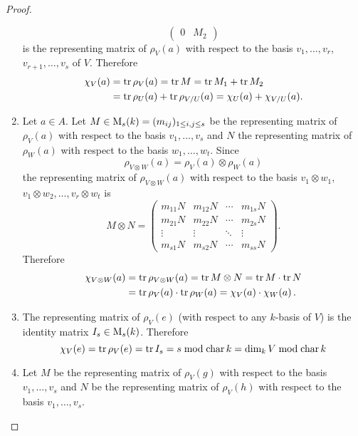 \begin{proof}
\begin{enumerate}[label=\emph{\alph*)},leftmargin=*]
\[\begin{pmatrix}
                    0 & M_2
                  \end{pmatrix}
      \]
      is the representing matrix of $\rho_V(a)$ with respect to the basis $v_1, \dotsc, v_r$, $v_{r+1}, \dotsc, v_s$ of $V$.
      Therefore
      \begin{align*}
            \chi_V(a)
        &=  \operatorname{tr} \rho_V(a)
         =  \operatorname{tr} M
         =  \operatorname{tr} M_1 + \operatorname{tr} M_2 \\
        &=  \operatorname{tr} \rho_U(a) + \operatorname{tr} \rho_{V/U}(a)
         =  \chi_U(a) + \chi_{V/U}(a).
      \end{align*}
    \item
      Let $a \in A$.
      Let $M \in \operatorname{M}_s(k) = (m_{ij})_{1 \leq i,j \leq s}$ be the representing matrix of $\rho_V(a)$ with respect to the basis $v_1, \dotsc, v_s$ and $N$ the representing matrix of $\rho_W(a)$ with respect to the basis $w_1, \dotsc, w_t$.
      Since
      \[
          \rho_{V \otimes W}(a)
        = \rho_V(a) \otimes \rho_W(a)
      \]
      the representing matrix of $\rho_{V \otimes W}(a)$ with respect to the basis $v_1 \otimes w_1$, $v_1 \otimes w_2, \dotsc, v_r \otimes w_t$ is
      \[
          M \otimes N
        = \begin{pmatrix}
            m_{11} N & m_{12} N & \cdots & m_{1s} N \\
            m_{21} N & m_{22} N & \cdots & m_{2s} N \\
            \vdots   & \vdots   & \ddots & \vdots   \\
            m_{s1} N & m_{s2} N & \cdots & m_{ss} N
          \end{pmatrix}.
      \]
      Therefore
      \begin{align*}
            \chi_{V \otimes W}(a)
        &=  \operatorname{tr} \rho_{V \otimes W}(a)
         =  \operatorname{tr} M \otimes N
         =  \operatorname{tr} M \cdot \operatorname{tr} N \\
        &=  \operatorname{tr} \rho_V(a) \cdot \operatorname{tr} \rho_W(a)
         =  \chi_V(a) \cdot \chi_W(a) \,.
      \end{align*}
    \item
      The representing matrix of $\rho_V(e)$ (with respect to any $k$-basis of $V$) is the identity matrix $I_s \in \operatorname{M}_s(k)$.
      Therefore
      \[
          \chi_V(e)
        = \operatorname{tr} \rho_V(e)
        = \operatorname{tr} I_s
        = s \bmod \operatorname{char} k
        = \dim_k V \bmod \operatorname{char} k
      \]
    \item
      Let $M$ be the representing matrix of $\rho_V(g)$ with respect to the basis $v_1, \dotsc, v_s$ and $N$ be the representing matrix of $\rho_V(h)$ with respect to the basis $v_1, \dotsc, v_s$.

\end{enumerate}
\end{proof}
